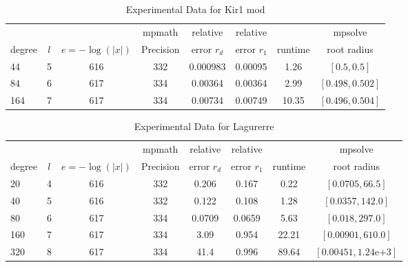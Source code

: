 \documentclass[sigconf]{acmart}
\begin{document}
\begin{table}[t]
\caption{Experimental Data for Kir1 mod}
\label{tab:kir1_mod}
\vskip -0.15in
\begin{center}
\begin{small}
\begin{sc}
\begin{tabular}{lccccccc}
\toprule
&  &  & mpmath & relative  & relative &  & mpsolve \\
degree  & $l$& $e=-\log(|x|)$& Precision &error $r_d$       & error $r_1$ &runtime& root radius\\
\midrule
 44 & 5 & 616 & 332 & 0.000983 & 0.00095 & 1.26 & $[0.5, 0.5]$\\
 84 & 6 & 617 & 334 & 0.00364 & 0.00364 & 2.99 & $[0.498, 0.502]$\\
 164 & 7 & 617 & 334 & 0.00734 & 0.00749 & 10.35 & $[0.496, 0.504]$\\ %
\bottomrule
\end{tabular}
\end{sc}
\end{small}
\end{center}
\vskip 0.05in
\end{table}


\begin{table}[t]
\caption{Experimental Data for  Lagurerre }
\label{tab:lagurerre}
\vskip -0.15in
\begin{center}
\begin{small}
\begin{sc}
\begin{tabular}{lccccccc}
\toprule
&  &  & mpmath & relative  & relative &  & mpsolve \\
degree  & $l$& $e=-\log(|x|)$& Precision &error $r_d$       & error $r_1$ &runtime& root radius\\
\midrule
 20 & 4 & 616 & 332 & 0.206 & 0.167 & 0.22 & $[0.0705, 66.5]$\\
 40 & 5 & 616 & 332 & 0.122 & 0.108 & 1.28 & $[0.0357, 142.0]$\\
 80 & 6 & 617 & 334 & 0.0709 & 0.0659 & 5.63 & $[0.018, 297.0]$\\
 160 & 7 & 617 & 334 & 3.09 & 0.954 & 22.21 & $[0.00901, 610.0]$\\
 320 & 8 & 617 & 334 & 41.4 & 0.996 & 89.64 & $[0.00451, 1.24\text{e+}3]$\\
\bottomrule
\end{tabular}
\end{sc}
\end{small}
\end{center}
\vskip 0.05in
\end{table}
\end{document}
